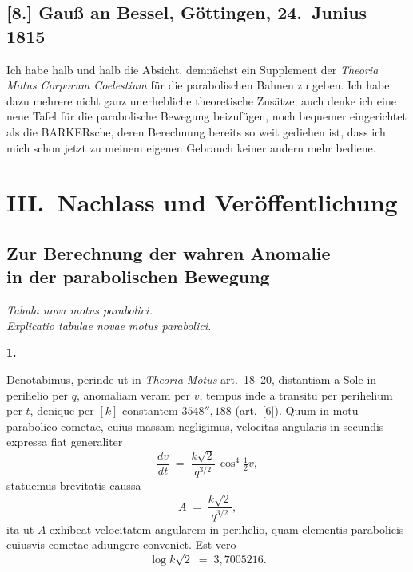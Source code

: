 \documentclass[11pt,a4paper]{article}
\begin{document}
\medskip

\subsection*{[8.] Gau\ss{} an Bessel, G\"ottingen, 24.~Junius 1815}

\medskip

Ich habe halb und halb die Absicht, demn\"achst ein Supplement der
\textit{Theoria Motus Corporum Coelestium} f\"ur die parabolischen
Bahnen zu geben. Ich habe dazu mehrere nicht ganz unerhebliche
theoretische Zus\"atze; auch denke ich eine neue Tafel f\"ur die
parabolische Bewegung beizuf\"ugen, noch bequemer eingerichtet als die
BARKERsche, deren Berechnung bereits so weit gediehen ist, dass ich mich
schon jetzt zu meinem eigenen Gebrauch keiner andern mehr bediene.

\bigskip

\section*{III.~Nachlass und Ver\"offentlichung}
\subsection*{Zur Berechnung der wahren Anomalie\\
in der parabolischen Bewegung}


\begin{center}\itshape Tabula nova motus parabolici.\\
Explicatio tabulae novae motus parabolici.\end{center}

\medskip

\begin{center}\textbf{1.}\end{center}

Denotabimus, perinde ut in \textit{Theoria Motus} art.\ 18--20,
distantiam a Sole in perihelio per $q$, anomaliam veram per $v$, tempus
inde a transitu per perihelium per $t$, denique per $[k]$ constantem
$3548''\!,188$ (art.\ [6]). Quum in motu parabolico cometae,
cuius massam negligimus, velocitas angularis in secundis expressa fiat
generaliter
\[
  \frac{dv}{dt} \;=\; \frac{k\sqrt{2}}{q^{3/2}}\,\cos^{4}\!\tfrac{1}{2}v,
\]
statuemus brevitatis caussa
\[
  A \;=\; \frac{k\sqrt{2}}{q^{3/2}},
\]
ita ut $A$ exhibeat velocitatem angularem in perihelio, quam elementis
parabolicis cuiusvis cometae adiungere conveniet. Est vero
\[
  \log k\sqrt{2} \;=\; 3{,}7005216.
\]
\end{document}
